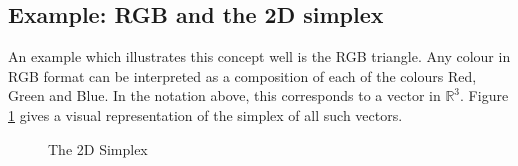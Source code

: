 \subsection{Example: RGB and the 2D simplex}
An example which illustrates this concept well is the RGB triangle. Any colour in RGB format can be interpreted as a composition of each of the colours Red, Green and Blue. In the notation above, this corresponds to a vector in $\mathbb{R}^3$.
Figure \ref{fig:rgbsimplex} gives a visual representation of the simplex of all such vectors. 

\usetikzlibrary{fadings}
\begin{figure}
 \begin{center}


    \caption{The 2D Simplex}
    \label{fig:rgbsimplex}
    
\end{center}
\end{figure}




